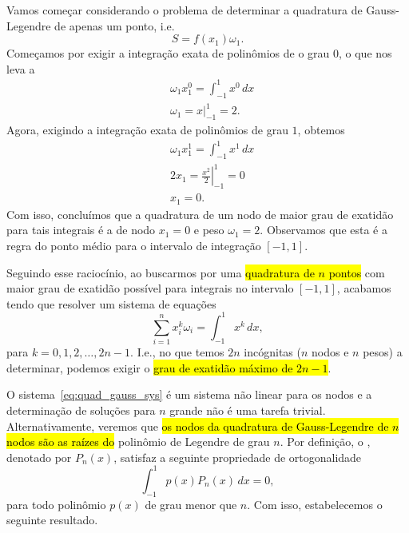 Vamos começar considerando o problema de determinar a quadratura de Gauss-Legendre de apenas um ponto, i.e.
\begin{equation}
  S = f(x_1)\omega_1.
\end{equation}
Começamos por exigir a integração exata de polinômios de o grau $0$, o que nos leva a
\begin{subequations}
  \begin{align}
    &\omega_1x_1^0 = \int_{-1}^1 x^0\,dx\\
    &\omega_1 = \left. x \right|_{-1}^1 = 2.
  \end{align}
\end{subequations}
Agora, exigindo a integração exata de polinômios de grau $1$, obtemos
\begin{subequations}
  \begin{align}
    &\omega_1x_1^1 = \int_{-1}^1 x^1\,dx \\
    &2x_1 = \left.\frac{x^2}{2}\right|_{-1}^1 = 0\\
    &x_1=0.
  \end{align}
\end{subequations}
Com isso, concluímos que a quadratura de um nodo de maior grau de exatidão para tais integrais é a de nodo $x_1=0$ e peso $\omega_1=2$. Observamos que esta é a regra do ponto médio para o intervalo de integração $[-1, 1]$.

Seguindo esse raciocínio, ao buscarmos por uma \hl{quadratura de $n$ pontos} com maior grau de exatidão possível para integrais no intervalo $[-1, 1]$, acabamos tendo que resolver um sistema de equações
\begin{equation}\label{eq:quad_gauss_sys}
  \sum_{i=1}^n x_i^k\omega_i = \int_{-1}^1 x^k\,dx,
\end{equation}
para $k = 0, 1, 2, \dotsc, 2n-1$. I.e., no que temos $2n$ incógnitas ($n$ nodos e $n$ pesos) a determinar, podemos exigir o \hl{grau de exatidão máximo de $2n-1$}.

O sistema~\eqref{eq:quad_gauss_sys} é um sistema não linear para os nodos e a determinação de soluções para $n$ grande não é uma tarefa trivial. Alternativamente, veremos que \hl{os nodos da quadratura de Gauss-Legendre de $n$ nodos são as raízes do} polinômio de Legendre de grau $n$. Por definição, o , denotado por $P_n(x)$, satisfaz a seguinte propriedade de ortogonalidade
\begin{equation}\label{eq:ortogonalidade_pol_Legendre}
  \int_{-1}^1 p(x)P_n(x)\,dx = 0,
\end{equation}
para todo polinômio $p(x)$ de grau menor que $n$. Com isso, estabelecemos o seguinte resultado.

